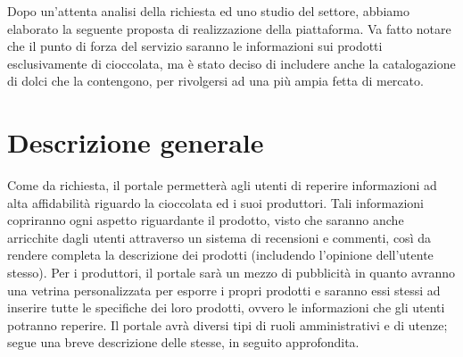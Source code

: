 Dopo un’attenta analisi della richiesta ed uno studio del settore, abbiamo elaborato la seguente proposta di realizzazione della piattaforma. Va fatto notare che il punto di forza del servizio saranno le informazioni sui prodotti esclusivamente di cioccolata, ma è stato deciso di includere anche la catalogazione di dolci che la contengono, per rivolgersi ad una più ampia fetta di mercato.

\section{Descrizione generale}
Come da richiesta, il portale permetterà agli utenti di reperire informazioni ad alta affidabilità riguardo la cioccolata ed i suoi produttori.
Tali informazioni copriranno ogni aspetto riguardante il prodotto, visto che saranno anche arricchite dagli utenti attraverso un sistema di recensioni e commenti, così da rendere completa la descrizione dei prodotti (includendo l'opinione dell'utente stesso).
Per i produttori, il portale sarà un mezzo di pubblicità in quanto avranno una vetrina personalizzata per esporre i propri prodotti e saranno essi stessi ad inserire tutte le specifiche dei loro prodotti, ovvero le informazioni che gli utenti potranno reperire.
Il portale avrà diversi tipi di ruoli amministrativi e di utenze; segue una breve descrizione delle stesse, in seguito approfondita. 
